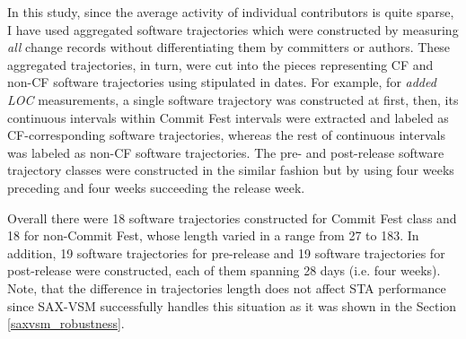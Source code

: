 In this study, since the average activity of individual contributors is quite sparse, I have used aggregated software trajectories which were constructed by measuring \textit{all} change records without differentiating them by committers or authors. These aggregated trajectories, in turn, were cut into the pieces representing CF and non-CF software trajectories using stipulated in \cite{commit-fest} dates. For example, for \textit{added LOC} measurements, a single software trajectory was constructed at first, then, its continuous intervals within Commit Fest intervals were extracted and labeled as CF-corresponding software trajectories, whereas the rest of continuous intervals was labeled as non-CF software trajectories. The pre- and post-release software trajectory classes were constructed in the similar fashion but by using four weeks preceding and four weeks succeeding the release week.

Overall there were 18 software trajectories constructed for Commit Fest class and 18 for non-Commit Fest, whose length varied in a range from 27 to 183. In addition, 19 software trajectories for pre-release and 19 software trajectories for post-release were constructed, each of them spanning 28 days (i.e. four weeks). Note, that the difference in trajectories length does not affect STA performance since SAX-VSM successfully handles this situation as it was shown in the Section \ref{saxvsm_robustness}.


